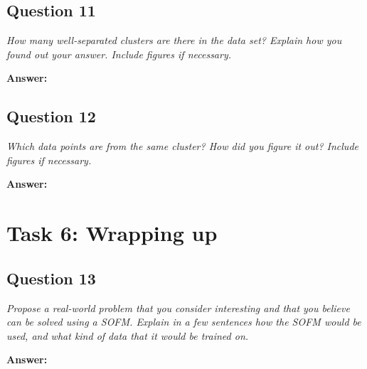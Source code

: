 \documentclass[a4paper]{article}
\begin{document}
\subsection*{Question 11}
\emph{How many well-separated clusters are there in the data set?
Explain how you found out your answer. Include figures if necessary.}

\textbf{Answer:} 

\subsection*{Question 12}
\emph{Which data points are from the same cluster? How did you
figure it out? Include figures if necessary.} 

\textbf{Answer:}

\section*{Task 6: Wrapping up}

\subsection*{Question 13}
\emph{Propose a real-world problem that you consider interesting and
that you believe can be solved using a SOFM. Explain in a few sentences how the
SOFM would be used, and what kind of data that it would be trained on.}

\textbf{Answer:} 
\end{document}

